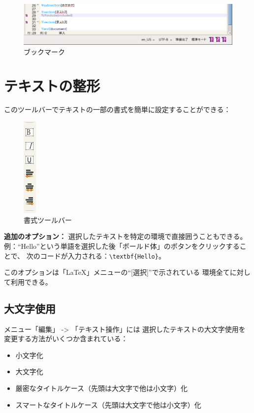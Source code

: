 \begin{figure}[H]
  \centering
  \includegraphics[width=.8\linewidth]{doc20.png}
  \caption{ブックマーク}
\end{figure}

\section{テキストの整形}

このツールバーでテキストの一部の書式を簡単に設定することができる：

\begin{figure}[H]
  \centering
  \includegraphics{doc6.png}
  \caption{書式ツールバー}
\end{figure}

\textbf{追加のオプション：}
選択したテキストを特定の環境で直接囲うこともできる。
例：``Hello''という単語を選択した後「ボールド体」のボタンをクリックすることで、
次のコードが入力される：\verb+\textbf{Hello}+。

このオプションは「LaTeX」メニューの``{[}選択{]}''で示されている
環境全てに対して利用できる。

\subsection{大文字使用}

メニュー「編集」 -\textgreater{} 「テキスト操作」には
選択したテキストの大文字使用を変更する方法がいくつか含まれている：

\begin{itemize}
\item
  小文字化
\item
  大文字化
\item
  厳密なタイトルケース（先頭は大文字で他は小文字）化
\item
  スマートなタイトルケース（先頭は大文字で他は小文字）化
\end{itemize}

